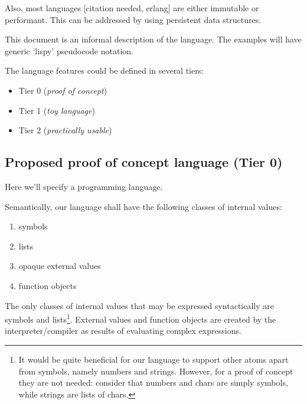 \documentclass[main.tex]{subfiles}
\begin{document}
Also, most languages [citation needed, erlang] are either immutable or performant.
This can be addressed by using persistent data structures.




This document is an informal description of the language. The examples will
have generic `lispy' pseudocode notation.

The language features could be defined in several tiers:
\begin{itemize}
    \item Tier 0 (\emph{proof of concept})
    \item Tier 1 (\emph{toy language})
    \item Tier 2 (\emph{practically usable})
\end{itemize}

\subsection{Proposed proof of concept language (Tier 0)}

Here we'll specify a programming language.

Semantically, our language shall have the following classes of internal values:
\begin{enumerate}
    \item symbols
    \item lists
    \item opaque external values
    \item function objects
\end{enumerate}

The only classes of internal values that may be expressed syntactically are
symbols and lists\footnote{%
    It would be quite beneficial for our language to
    support other atoms apart from symbols, namely numbers and strings.
    However, for a proof of concept they are not needed: consider that numbers
    and chars are simply symbols, while strings are lists of chars.}.
External values and function objects are created by the interpreter/compiler as
results of evaluating complex expressions.
\end{document}
